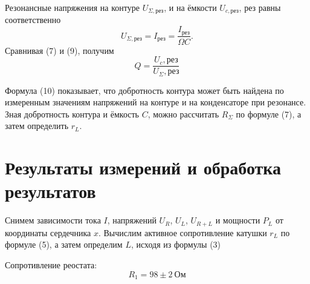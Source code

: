 Резонансные напряжения на контуре
$U_{\Sigma, \text{рез}}$,
и на ёмкости $U_{c, \text{рез}}$, рез равны
соответственно
\begin{equation}
    U_{\Sigma, \text{рез}} =
    I_{\text{рез}} =
    \frac{I_\text{рез}}{\Omega C}.
\end{equation}
Сравнивая (7) и (9), получим 
\begin{equation}
    Q = \frac{U_c, \text{рез}}{U_\Sigma,
    \text{рез}}
\end{equation}

Формула (10) показывает, что добротность
контура может быть найдена по измеренным
значениям напряжений на контуре и на
конденсаторе при резонансе. Зная
добротность контура и ёмкость $C$, можно
рассчитать $R_\Sigma$ по формуле (7), а затем
определить $r_L$.

\section{Результаты измерений и обработка результатов}

Снимем зависимости тока $I$, напряжений
$U_R$, $U_L$, $U_{R+L}$ и мощности $P_L$
от координаты сердечника $x$. Вычислим
активное сопротивление катушки $r_L$ по
формуле (5), а затем определим $L$,
исходя из формулы (3)

Сопротивление реостата:
\[
    R_1 = 98 \pm 2\ \text{Ом}
\]

